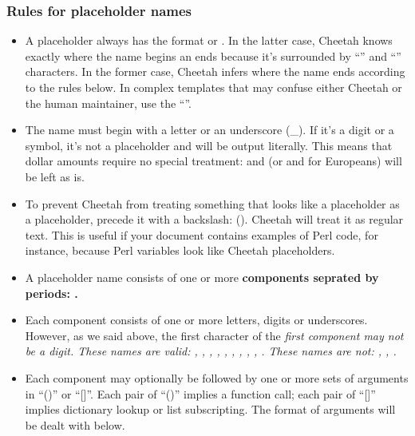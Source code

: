 \subsubsection{Rules for placeholder names}
\begin{itemize} 

\item A placeholder always has the format  or .
     In the latter case, Cheetah knows exactly where the name begins an ends
     because it's surrounded by ``{'' and ``}'' characters.  In the former
     case, Cheetah infers where the name ends according to the rules below.  In
     complex templates that may confuse either Cheetah or the human maintainer,
     use the ``{}''.

\item The name must begin with a letter or an underscore (\_).  If it's a digit
     or a symbol, it's not a placeholder and will be output literally.  This 
     means that dollar amounts require no special treatment: 
     and  (or  and  for
     Europeans) will be left as is.
     
\item To prevent Cheetah from treating something that looks like a placeholder
     as a placeholder, precede it with a backslash: 
     ().  Cheetah will treat it as regular text.
     This is useful if your document contains examples of Perl code, for
     instance, because Perl variables look like Cheetah placeholders.

\item A placeholder name consists of one or more \bf{components} seprated by
     periods:   .

\item Each component consists of one or more letters, digits or underscores.
     However, as we said above, the first character of the \em{first}
     component may not be a digit.  These names are valid: ,
     \code{\$\_}, , , , ,
     , , ,
     .  These names are not: , ,
     .


\item Each component may optionally be followed by one or more sets of 
     arguments in ``()'' or ``[]''.  Each pair of ``()'' implies a function
     call; each pair of ``[]'' implies dictionary lookup or list
     subscripting.  The format of arguments will be dealt with below.


\end{itemize}
